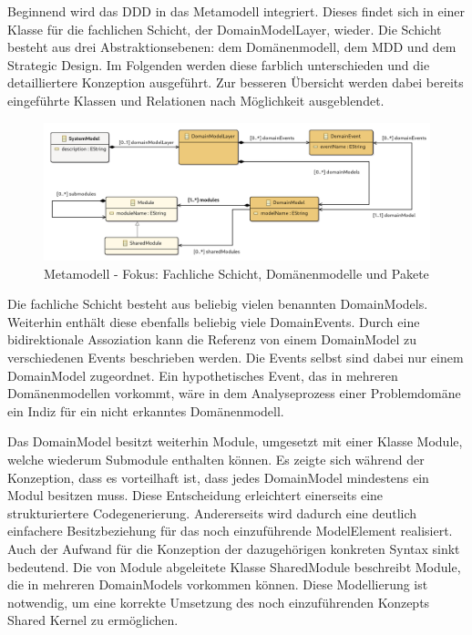 Beginnend wird das DDD in das Metamodell integriert. Dieses findet sich in einer Klasse für die fachlichen Schicht, der \glqq DomainModelLayer\grqq{}, wieder. Die Schicht besteht aus drei Abstraktionsebenen: dem Domänenmodell, dem MDD und dem Strategic Design. Im Folgenden werden diese farblich unterschieden und die detailliertere Konzeption ausgeführt. Zur besseren Übersicht werden dabei bereits eingeführte Klassen und Relationen nach Möglichkeit ausgeblendet.

\begin{figure}[ht]
\centering
\includegraphics[width=\textwidth]{bilder/k4/1.png}
\caption[Metamodell - Fokus: Fachliche Schicht, Domänenmodelle und Pakete]{Metamodell - Fokus: Fachliche Schicht, Domänenmodelle und Pakete}
\end{figure}

Die fachliche Schicht besteht aus beliebig vielen benannten \glqq DomainModels\grqq{}. Weiterhin enthält diese ebenfalls beliebig viele \glqq DomainEvents\grqq{}. Durch eine bidirektionale Assoziation kann die Referenz von einem DomainModel zu verschiedenen Events beschrieben werden. Die Events selbst sind dabei nur einem DomainModel zugeordnet. Ein hypothetisches Event, das in mehreren Domänenmodellen vorkommt, wäre in dem Analyseprozess einer Problemdomäne ein Indiz für ein nicht erkanntes Domänenmodell.

Das DomainModel besitzt weiterhin Module, umgesetzt mit einer Klasse \glqq Module\grqq{}, welche wiederum Submodule enthalten können. Es zeigte sich während der Konzeption, dass es vorteilhaft ist, dass jedes DomainModel mindestens ein Modul besitzen muss. Diese Entscheidung erleichtert einerseits eine strukturiertere Codegenerierung. Andererseits wird dadurch eine deutlich einfachere Besitzbeziehung für das noch einzuführende \glqq ModelElement\grqq{} realisiert. Auch der Aufwand für die  Konzeption der dazugehörigen konkreten Syntax sinkt bedeutend. Die von Module abgeleitete Klasse \glqq SharedModule\grqq{} beschreibt Module, die in mehreren DomainModels vorkommen können. Diese Modellierung ist notwendig, um eine korrekte Umsetzung des noch einzuführenden Konzepts Shared Kernel zu ermöglichen.

